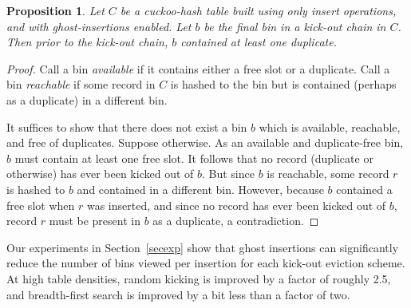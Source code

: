 \documentclass{sig-alternate-05-2015}
\newtheorem{prop}[thm]{Proposition}
\begin{document}
\begin{prop}\label{propghost}
  Let $C$ be a cuckoo-hash table built using only insert operations,
  and with ghost-insertions enabled. Let $b$ be the final bin in a
  kick-out chain in $C$. Then prior to the kick-out chain, $b$
  contained at least one duplicate.
\end{prop}
\begin{proof}
  Call a bin \emph{available} if it contains either a free slot or a
  duplicate. Call a bin \emph{reachable} if some record in $C$ is
  hashed to the bin but is contained (perhaps as a duplicate) in a
  different bin.

  It suffices to show that there does not exist a bin $b$ which is
  available, reachable, and free of duplicates. Suppose otherwise. As
  an available and duplicate-free bin, $b$ must contain at least one
  free slot. It follows that no record (duplicate or otherwise) has
  ever been kicked out of $b$. But since $b$ is reachable, some record
  $r$ is hashed to $b$ and contained in a different bin. However,
  because $b$ contained a free slot when $r$ was inserted, and since
  no record has ever been kicked out of $b$, record $r$ must be
  present in $b$ as a duplicate, a contradiction.
\end{proof}

Our experiments in Section~\ref{secexp} show that ghost insertions can
significantly reduce the number of bins viewed per insertion for each
kick-out eviction scheme. At high table densities, random kicking is
improved by a factor of roughly 2.5, and breadth-first search is
improved by a bit less than a factor of two. 
\end{document}
